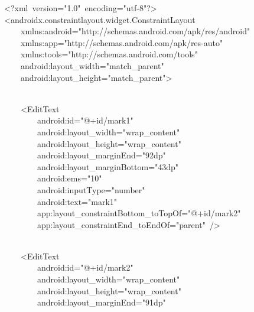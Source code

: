 {\ttfamily\small \textless{}?xml\ version="1.0"\ encoding="utf-8"?\textgreater{}} \\
{\ttfamily\small \textless{}androidx.constraintlayout.widget.ConstraintLayout} \\
{\ttfamily\small \ \ \ \ xmlns:android="http://schemas.android.com/apk/res/android"} \\
{\ttfamily\small \ \ \ \ xmlns:app="http://schemas.android.com/apk/res-auto"} \\
{\ttfamily\small \ \ \ \ xmlns:tools="http://schemas.android.com/tools"} \\
{\ttfamily\small \ \ \ \ android:layout\_width="match\_parent"} \\
{\ttfamily\small \ \ \ \ android:layout\_height="match\_parent"\textgreater{}} \\
\strut \\
{\ttfamily\small \ \ \ \ \textless{}EditText} \\
{\ttfamily\small \ \ \ \ \ \ \ \ android:id="@+id/mark1"} \\
{\ttfamily\small \ \ \ \ \ \ \ \ android:layout\_width="wrap\_content"} \\
{\ttfamily\small \ \ \ \ \ \ \ \ android:layout\_height="wrap\_content"} \\
{\ttfamily\small \ \ \ \ \ \ \ \ android:layout\_marginEnd="92dp"} \\
{\ttfamily\small \ \ \ \ \ \ \ \ android:layout\_marginBottom="43dp"} \\
{\ttfamily\small \ \ \ \ \ \ \ \ android:ems="10"} \\
{\ttfamily\small \ \ \ \ \ \ \ \ android:inputType="number"} \\
{\ttfamily\small \ \ \ \ \ \ \ \ android:text="mark1"} \\
{\ttfamily\small \ \ \ \ \ \ \ \ app:layout\_constraintBottom\_toTopOf="@+id/mark2"} \\
{\ttfamily\small \ \ \ \ \ \ \ \ app:layout\_constraintEnd\_toEndOf="parent"\ /\textgreater{}} \\
\strut \\
{\ttfamily\small \ \ \ \ \textless{}EditText} \\
{\ttfamily\small \ \ \ \ \ \ \ \ android:id="@+id/mark2"} \\
{\ttfamily\small \ \ \ \ \ \ \ \ android:layout\_width="wrap\_content"} \\
{\ttfamily\small \ \ \ \ \ \ \ \ android:layout\_height="wrap\_content"} \\
{\ttfamily\small \ \ \ \ \ \ \ \ android:layout\_marginEnd="91dp"} \\
